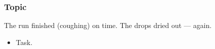 \subsubsection{Topic}

The run finished (coughing) on time.
The drops dried out --- again.

\begin{itemize}[label=\unchecked]
\item Task.
\end{itemize}
